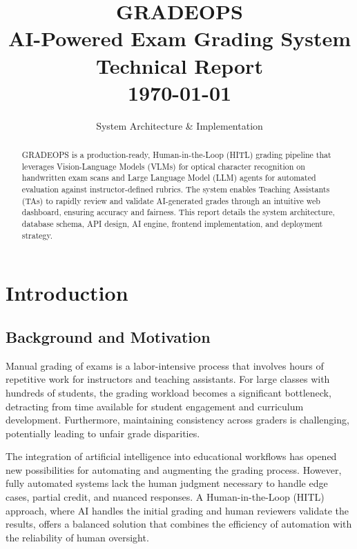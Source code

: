 \documentclass[11pt,a4paper]{article}
\title{
    \vspace{-1cm}
    {\Huge\textbf{GRADEOPS}}\\[0.5em]
    {\Large\color{gray}AI-Powered Exam Grading System}\\[2em]
    {\large Technical Report}\\[0.5em]
    {\normalsize\today}
}
\author{System Architecture \& Implementation}
\date{}
\begin{document}
\maketitle
\thispagestyle{empty}
\newpage

\begin{abstract}
\noindent
GRADEOPS is a production-ready, Human-in-the-Loop (HITL) grading pipeline that leverages Vision-Language Models (VLMs) for optical character recognition on handwritten exam scans and Large Language Model (LLM) agents for automated evaluation against instructor-defined rubrics. The system enables Teaching Assistants (TAs) to rapidly review and validate AI-generated grades through an intuitive web dashboard, ensuring accuracy and fairness. This report details the system architecture, database schema, API design, AI engine, frontend implementation, and deployment strategy.
\end{abstract}

\tableofcontents
\newpage

\section{Introduction}
\label{sec:introduction}

\subsection{Background and Motivation}
Manual grading of exams is a labor-intensive process that involves hours of repetitive work for instructors and teaching assistants. For large classes with hundreds of students, the grading workload becomes a significant bottleneck, detracting from time available for student engagement and curriculum development. Furthermore, maintaining consistency across graders is challenging, potentially leading to unfair grade disparities.

The integration of artificial intelligence into educational workflows has opened new possibilities for automating and augmenting the grading process. However, fully automated systems lack the human judgment necessary to handle edge cases, partial credit, and nuanced responses. A Human-in-the-Loop (HITL) approach, where AI handles the initial grading and human reviewers validate the results, offers a balanced solution that combines the efficiency of automation with the reliability of human oversight.
\end{document}
